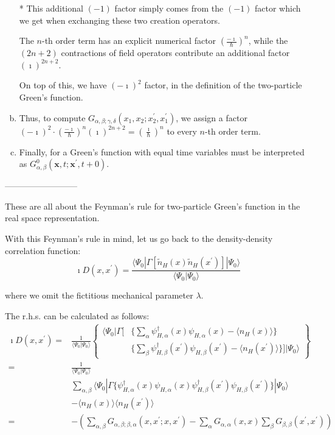 \begin{enumerate}[(a)]
* This additional $(-1)$ factor simply comes from the $(-1)$ factor which we get when exchanging these two creation operators.

The $n$-th order term has an explicit numerical factor $\left( \frac{-\imath}{\hbar} \right)^n$, while the $(2n+2)$ contractions of field operators contribute an additional factor $(\imath)^{2n+2}$.

On top of this, we have $(-\imath)^2$ factor, in the definition of the two-particle Green's function.
\item Thus, to compute $G_{\alpha,\beta;\gamma,\delta}(x_1,x_2;x_2^{'},x_1^{'})$, we assign a factor $(-\imath)^2\cdot\left( \frac{-\imath}{\hbar} \right)^n(\imath)^{2n+2} = \left( \frac{\imath}{\hbar} \right)^n$ to every $n$-th order term.

\item Finally, for a Green's function with equal time variables must be interpreted as $G_{\alpha,\beta}^0 (\mathbf{x},t;\mathbf{x}^{'},t+0)$.
\end{enumerate}

\begin{center}--------------------------\end{center}

These are all about the Feynman's rule for two-particle Green's function in the real space representation.

With this Feynman's rule in mind, let us go back to the density-density correlation function:
\[\imath D(x,x^{'}) = \frac{\langle \Psi_0|\Gamma[\tilde{n}_H(x)\tilde{n}_H(x^{'})]|\Psi_0\rangle} {\langle \Psi_0|\Psi_0 \rangle}\]

where we omit the fictitious mechanical parameter $\lambda$.

The r.h.s. can be calculated as follows:
\[ \begin{split} \imath D(x,x^{'})
=&\frac{1}{\langle \Psi_0 | \Psi_0 \rangle}\left\{
\begin{split} \langle \Psi_0|\Gamma[&\{\sum_\alpha \psi_{H,\alpha}^\dagger(x)\psi_{H,\alpha}(x)-\langle n_H (x) \rangle\}\\
&\{\sum_\beta \psi_{H,\beta}^\dagger(x^{'}) \psi_{H,\beta}(x^{'})-\langle n_H (x^{'}) \rangle\}]|\Psi_0 \rangle
 \end{split} \right\}\\
=&\frac{1}{\langle \Psi_0 | \Psi_0 \rangle}\\
&\sum_{\alpha,\beta} \langle \Psi_0 | \Gamma\{\psi_{H,\alpha}^\dagger(x)\psi_{H,\alpha}(x)\psi_{H,\beta}^\dagger(x^{'})\psi_{H,\beta}(x^{'})\}|\Psi_0 \rangle\\
&-\langle n_H(x) \rangle \langle n_H(x^{'}) \rangle\\
=& - \left( \sum_{\alpha,\beta} G_{\alpha,\beta;\beta,\alpha}(x,x^{'};x,x^{'}) - \sum_{\alpha} G_{\alpha,\alpha}(x,x) \sum_{\beta}G_{\beta,\beta}(x^{'},x^{'}) \right)
 \end{split}\]

